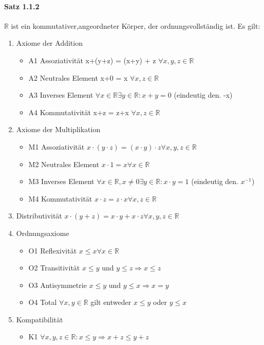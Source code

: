 \documentclass[8pt]{extreport}
\begin{document}
\paragraph{Satz 1.1.2} $\mathbb{R}$ ist ein kommutativer,angeordneter Körper, der ordnungsvollständig ist. Es gilt:
\begin{enumerate}
\item Axiome der Addition
\begin{itemize}
\item A1 Assoziativität			x+(y+z) = (x+y) + z $\forall x,y,z \in \mathbb{R}$
\item A2 Neutrales Element x+0 = x $\forall x,z \in \mathbb{R}$
\item A3 Inverses Element  $\forall x \in \mathbb{R} \exists y \in \mathbb{R}: x+y = 0$ (eindeutig den. -x)
\item A4 Kommutativität 	x+z = z+x $\forall x,z \in \mathbb{R}$
\end{itemize}
\item Axiome der Multiplikation
\begin{itemize}
\item M1 Assoziativität $x\cdot(y\cdot z) = (x \cdot y)\cdot z \forall x,y,z \in \mathbb{R}$
\item M2 Neutrales Element $x\cdot 1 = x \forall x \in \mathbb{R}$
\item M3 Inverses Element $\forall x \in \mathbb{R}, x\neq 0 \exists y \in \mathbb{R}: x\cdot y  = 1$ (eindeutig den. $x^{-1}$)
\item M4 Kommutativität $x\cdot z = z\cdot x \forall x,z \in \mathbb{R}$
\end{itemize}
\item Distributivität $x\cdot(y+z) = x\cdot y + x\cdot z \forall x,y,z \in \mathbb{R}$
\item Ordnungsaxiome
\begin{itemize}
\item O1 Reflexivität $x\leq x \forall x \in \mathbb{R}$
\item O2 Transitivität $x\leq y \text{ und } y\leq z \Rightarrow x\leq z$
\item O3 Antisymmetrie $x\leq y \text{ und } y\leq x \Rightarrow x = y$
\item O4 Total $\forall x,y \in \mathbb{R}$ gilt entweder $x\leq y$ oder $y\leq x$
\end{itemize}
\item Kompatibilität
\begin{itemize}
\item K1 $\forall x,y,z \in \mathbb{R}: x\leq y \Rightarrow x+z \leq y+z$

\end{itemize}
\end{enumerate}
\end{document}
